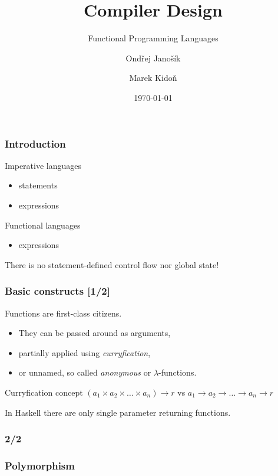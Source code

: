 \documentclass{beamer}
\title{Compiler Design}
\subtitle{Functional Programming Languages}
\author[Ondřej Janošík \and Marek Kidoň]{Ondřej Janošík \and Marek Kidoň}
\institute{Faculty of Information Technology, Brno University of Technology}
\date{\today}
\begin{document}
\frame{\maketitle}

\begin{frame} \frametitle{Introduction}

Imperative languages
  \begin{itemize}
    \item statements
    \item expressions
  \end{itemize}

\vspace{5pt}
Functional languages
  \begin{itemize}
      \item expressions
  \end{itemize}

\vspace{10pt}
There is no statement-defined control flow nor global state!
\end{frame}

\begin{frame} \frametitle{Basic constructs [1/2]}
  Functions are first-class citizens.
  \begin{itemize}
      \item They can be passed around as arguments,
      \item partially applied using \textit{curryfication},
      \item or unnamed, so called \textit{anonymous} or $\lambda$-functions.
  \end{itemize}

  \vspace{10pt}
  Curryfication concept
  $(a_{1} \times a_{2} \times \ldots \times a_{n}) \to r$
  vs
  $a_{1} \to a_{2} \to \ldots \to a_{n} \to r$

  \vspace{5pt}
  In Haskell there are only single parameter returning functions.
\end{frame}

\begin{frame} \frametitle{2/2}

\end{frame}

\begin{frame} \frametitle{Polymorphism}
  

\end{frame}
\end{document}
